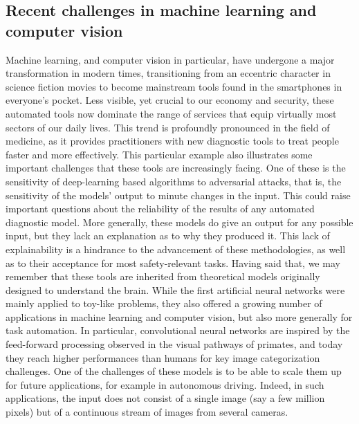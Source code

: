\documentclass[default]{sn-jnl}%
\theoremstyle{thmstyleone}%
\theoremstyle{thmstyletwo}%
\theoremstyle{thmstylethree}%
\begin{document}
\subsection{Recent challenges in machine learning and computer vision}
Machine learning, and computer vision in particular, have undergone a major transformation in modern times, transitioning from an eccentric character in science fiction movies to become mainstream tools found in the smartphones in everyone's pocket. Less visible, yet crucial to our economy and security, these automated tools now dominate the range of services that equip virtually most sectors of our daily lives. This trend is profoundly pronounced in the field of medicine, as it provides practitioners with new diagnostic tools to treat people faster and more effectively. This particular example also illustrates some important challenges that these tools are increasingly facing. One of these is the sensitivity of deep-learning based algorithms to adversarial attacks, that is, the sensitivity of the models' output to minute changes in the input. This could raise important questions about the reliability of the results of any automated diagnostic model. More generally, these models do give an output for any possible input, but they lack an explanation as to why they produced it. This lack of explainability is a hindrance to the advancement of these methodologies, as well as to their acceptance for most safety-relevant tasks. Having said that, we may remember that these tools are inherited from theoretical models originally designed to understand the brain. While the first artificial neural networks were mainly applied to toy-like problems, they also offered a growing number of applications in machine learning and computer vision, but also more generally for task automation. In particular, convolutional neural networks are inspired by the feed-forward processing observed in the visual pathways of primates, and today they reach higher performances than humans for key image categorization challenges. One of the challenges of these models is to be able to scale them up for future applications, for example in autonomous driving. Indeed, in such applications, the input does not consist of a single image (say a few million pixels) but of a continuous stream of images from several cameras.
\end{document}
